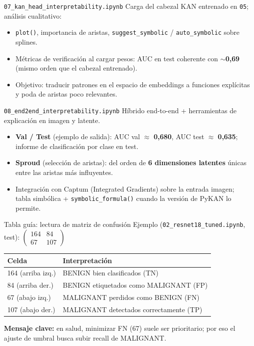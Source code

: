 \documentclass[aspectratio=169,spanish]{beamer}
\begin{document}
\begin{frame}{\texttt{07\_kan\_head\_interpretability.ipynb}}
  Carga del cabezal KAN entrenado en \texttt{05}; análisis cualitativo:
  \begin{itemize}
    \item \texttt{plot()}, importancia de aristas, \texttt{suggest\_symbolic} / \texttt{auto\_symbolic} sobre splines.
    \item Métricas de verificación al cargar pesos: AUC en test coherente con \textbf{$\sim$0{,}69} (mismo orden que el cabezal entrenado).
    \item Objetivo: traducir patrones en el espacio de embeddings a funciones explícitas y poda de aristas poco relevantes.
  \end{itemize}
\end{frame}

\begin{frame}{\texttt{08\_end2end\_interpretability.ipynb}}
  Híbrido end-to-end + herramientas de explicación en imagen y latente.
  \begin{itemize}
    \item \textbf{Val / Test} (ejemplo de salida): AUC val $\approx$ \textbf{0{,}680}, AUC test $\approx$ \textbf{0{,}635}; informe de clasificación por clase en test.
    \item \textbf{Sproud} (selección de aristas): del orden de \textbf{6 dimensiones latentes} únicas entre las aristas más influyentes.
    \item Integración con Captum (Integrated Gradients) sobre la entrada imagen; tabla simbólica + \texttt{symbolic\_formula()} cuando la versión de PyKAN lo permite.
  \end{itemize}
\end{frame}

\begin{frame}{Tabla guía: lectura de matriz de confusión}
  \small
  Ejemplo (\texttt{02\_resnet18\_tuned.ipynb}, test):\quad
  $\begin{pmatrix}
  164 & 84\\
  67 & 107
  \end{pmatrix}$

  \vspace{0.7em}
  \begin{tabular}{@{}ll@{}}
    \toprule
    Celda & Interpretación \\
    \midrule
    164 (arriba izq.) & BENIGN bien clasificados (TN) \\
    84 (arriba der.) & BENIGN etiquetados como MALIGNANT (FP) \\
    67 (abajo izq.) & MALIGNANT perdidos como BENIGN (FN) \\
    107 (abajo der.) & MALIGNANT detectados correctamente (TP) \\
    \bottomrule
  \end{tabular}

  \vspace{0.7em}
  \textbf{Mensaje clave:} en salud, minimizar FN (67) suele ser prioritario; por eso el ajuste de umbral busca subir recall de MALIGNANT.
\end{frame}
\end{document}
